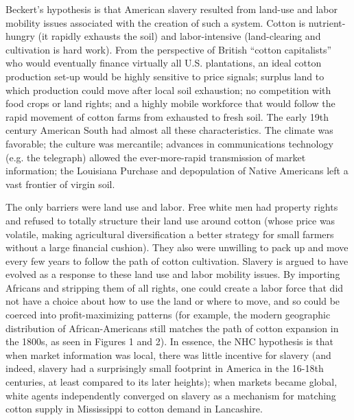\documentclass{article}
\begin{document}
Beckert's hypothesis is that American slavery resulted from 
land-use and labor mobility issues associated with the creation
of such a system. Cotton is nutrient-hungry (it rapidly exhausts the soil) and labor-intensive
(land-clearing and cultivation is hard work). From the perspective of British ``cotton
capitalists'' who would eventually finance virtually all U.S. plantations, 
an ideal cotton production set-up would be highly sensitive to price signals; 
surplus land to which production could move after local soil exhaustion; 
no competition with food crops or land rights; and a highly mobile workforce 
that would follow the rapid movement of cotton farms from exhausted to
fresh soil. The early 19th century American South had almost all these
characteristics. The climate was favorable; the culture was mercantile; 
advances in communications technology (e.g. the telegraph) allowed the ever-more-rapid transmission of 
market information; the Louisiana Purchase and depopulation of Native Americans 
left a vast frontier of virgin soil. 

The only barriers were land use and labor. Free white
men had property rights and refused to totally structure their land use 
around cotton (whose price was volatile, making agricultural 
diversification a better strategy for small farmers without a large financial cushion).
They also were unwilling to pack up and move every few years to follow the path
of cotton cultivation. Slavery is argued to
have evolved as a response to these land use and labor mobility issues.
By importing Africans and stripping them of all rights, 
one could create a labor force that did not have a choice 
about how to use the land or where to move, and so could be coerced into
profit-maximizing patterns (for example, the modern geographic distribution of 
African-Americans still matches the path of cotton expansion in the
1800s, as seen in Figures 1 and 2). In essence, the NHC hypothesis is that when 
market information was local, there was little incentive
for slavery (and indeed, slavery had a surprisingly small footprint in America
in the 16-18th centuries, at least compared to its later heights); 
when markets became global, white agents independently converged on
slavery as a mechanism for  matching cotton supply in Mississippi to cotton demand in Lancashire. 
\end{document}
